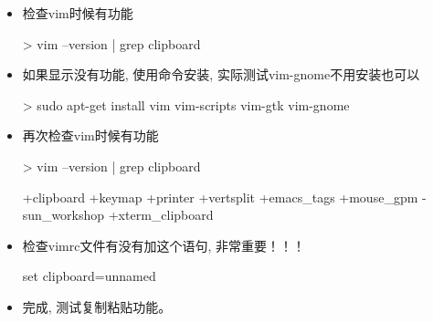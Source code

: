 \begin{itemize}
\item 检查vim时候有功能
\begin{commandbox}
 > vim --version | grep clipboard
\end{commandbox}

\item 如果显示没有功能, 使用命令安装, 实际测试vim-gnome不用安装也可以
\begin{commandbox}
 > sudo apt-get install vim vim-scripts vim-gtk vim-gnome
\end{commandbox}

\item 再次检查vim时候有功能
\begin{commandbox}
 > vim --version | grep clipboard
\end{commandbox}

\begin{messagebox}
+clipboard         +keymap            +printer           +vertsplit
+emacs_tags        +mouse_gpm         -sun_workshop      +xterm_clipboard
\end{messagebox}

\item 检查vimrc文件有没有加这个语句, 非常重要！！！
\begin{messagebox}
set clipboard=unnamed
\end{messagebox}

\item 完成, 测试复制粘贴功能。

\end{itemize}
